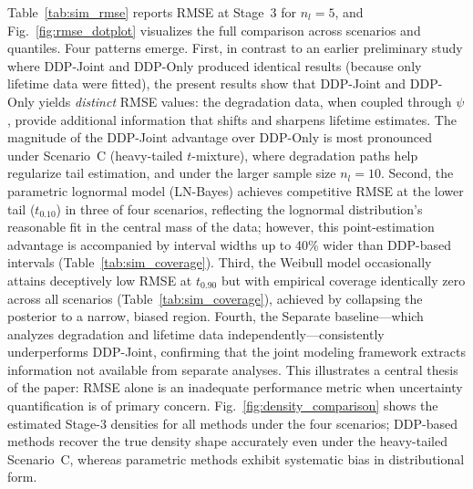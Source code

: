 \documentclass[a4paper,fleqn,longmktitle]{cas-sc}
\begin{document}
Table~\ref{tab:sim_rmse} reports RMSE at Stage~3 for $n_l = 5$, and Fig.~\ref{fig:rmse_dotplot} visualizes the full comparison across scenarios and quantiles. Four patterns emerge. First, in contrast to an earlier preliminary study where DDP-Joint and DDP-Only produced identical results (because only lifetime data were fitted), the present results show that DDP-Joint and DDP-Only yields \emph{distinct} RMSE values: the degradation data, when coupled through $\psi$, provide additional information that shifts and sharpens lifetime estimates. The magnitude of the DDP-Joint advantage over DDP-Only is most pronounced under Scenario~C (heavy-tailed $t$-mixture), where degradation paths help regularize tail estimation, and under the larger sample size $n_l = 10$. Second, the parametric lognormal model (LN-Bayes) achieves competitive RMSE at the lower tail ($t_{0.10}$) in three of four scenarios, reflecting the lognormal distribution's reasonable fit in the central mass of the data; however, this point-estimation advantage is accompanied by interval widths up to 40\% wider than DDP-based intervals (Table~\ref{tab:sim_coverage}). Third, the Weibull model occasionally attains deceptively low RMSE at $t_{0.90}$ but with empirical coverage identically zero across all scenarios (Table~\ref{tab:sim_coverage}), achieved by collapsing the posterior to a narrow, biased region. Fourth, the Separate baseline---which analyzes degradation and lifetime data independently---consistently underperforms DDP-Joint, confirming that the joint modeling framework extracts information not available from separate analyses. This illustrates a central thesis of the paper: RMSE alone is an inadequate performance metric when uncertainty quantification is of primary concern. Fig.~\ref{fig:density_comparison} shows the estimated Stage-3 densities for all methods under the four scenarios; DDP-based methods recover the true density shape accurately even under the heavy-tailed Scenario~C, whereas parametric methods exhibit systematic bias in distributional form.
\end{document}
